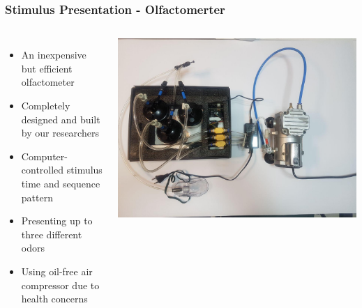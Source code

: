 \documentclass{beamer}
\begin{document}
\begin{frame}
\frametitle{Stimulus Presentation - Olfactomerter}
	\begin{columns}[c] %
		
			\begin{itemize}
			\item
			An inexpensive but efficient olfactometer
			\item
			Completely designed and built by our researchers
			\item
			Computer-controlled stimulus time and sequence pattern
			\item
			Presenting up to three different odors
			\item
			Using oil-free air compressor due to health concerns
		\end{itemize}
			
			\includegraphics[scale=0.2]{olfactometer.jpg}	
		
	\end{columns}
\end{frame}
\end{document}
